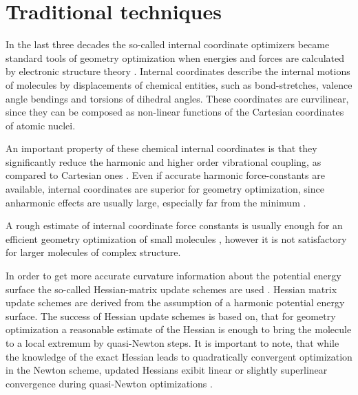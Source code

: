\documentclass[prl,aps,twocolumn,showpacs,twocolumngrid,superbib]{revtex4}
\begin{document}
\section{Traditional techniques}
In the last three decades the so-called internal coordinate 
optimizers became standard tools of geometry optimization when energies 
and forces are calculated by electronic structure theory 
\cite{Pulay_natural_internals}.
Internal coordinates describe the internal motions of molecules 
by displacements of chemical entities, such as bond-stretches, 
valence angle bendings and torsions of dihedral angles. These 
coordinates are curvilinear, since they can be composed
as non-linear functions of the Cartesian coordinates of atomic nuclei.

An important property of these chemical internal coordinates
is that they significantly reduce the harmonic and higher order 
vibrational coupling, as compared to Cartesian ones 
\cite{fogarasi_diaghess}. 
Even if accurate harmonic force-constants are available, 
internal coordinates are superior for geometry optimization, 
since anharmonic effects are
usually large, especially far from the minimum 
\cite{Baker_deloc_1}. 

A rough estimate of internal coordinate force constants is usually 
enough for an efficient geometry optimization of small molecules
\cite{bakken,fogarasi_diaghess}, however it is not satisfactory
for larger molecules of complex structure.

In order to get more accurate curvature information about the 
potential energy surface the so-called Hessian-matrix update schemes
are used \cite{RFletcher}. 
Hessian matrix update schemes are derived from the assumption of a 
harmonic potential energy surface. 
The success of Hessian update schemes is based on, that for geometry 
optimization a reasonable estimate of the Hessian 
is enough to bring the molecule to a local extremum by 
quasi-Newton steps. It is important to note, that while the knowledge
of the exact Hessian leads to quadratically convergent optimization
in the Newton scheme, updated Hessians exibit linear or slightly 
superlinear
convergence during quasi-Newton optimizations
\cite{RFletcher,fogarasi_diaghess}.
\end{document}
